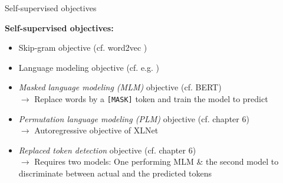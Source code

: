 
\begin{frame}{Self-supervised objectives}

\vfill

\textbf{Self-supervised objectives:}
	
	\begin{itemize}
		\item Skip-gram objective (cf. word2vec )
		\item Language modeling objective (cf. e.g. )
		\item \textit{Masked language modeling (MLM)} objective (cf. BERT)\\
					$\rightarrow$ Replace words by a \texttt{[MASK]} token and train the model to predict
		\item \textit{Permutation language modeling (PLM)} objective (cf. chapter 6)\\
					$\rightarrow$ Autoregressive objective of XLNet
		\item \textit{Replaced token detection} objective (cf. chapter 6)\\
					$\rightarrow$ Requires two models: One performing MLM \& the second model to discriminate between actual and the predicted tokens
	\end{itemize}
\vfill

\end{frame}


\endlecture

